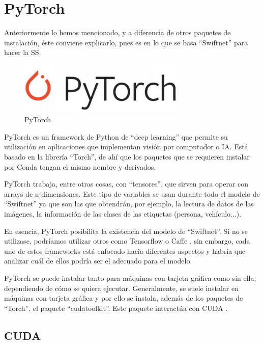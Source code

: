 \section{PyTorch}

Anteriormente lo hemos mencionado, y a diferencia de otros paquetes de instalación, éste conviene explicarlo, pues es en lo que se basa ``Swiftnet'' para hacer la \ac{SS}.

\begin{figure}[H]
  \centering
  \includegraphics[width=8cm]{Figuras/PyTorch.eps}
  \caption{PyTorch}
\end{figure}

PyTorch \cite{pytorch} es un framework de Python de ``deep learning'' que permite su utilización en aplicaciones que implementan visión por computador o IA. Está basado en la librería ``Torch'', de ahí que los paquetes que se requieren instalar por Conda tengan el mismo nombre y derivados.

PyTorch trabaja, entre otras cosas, con ``tensores'', que sirven para operar con arrays de n-dimensiones. Este tipo de variables se usan durante todo el modelo de ``Swiftnet'' ya que son las que obtendrán, por ejemplo, la lectura de datos de las imágenes, la información de las clases de las etiquetas (persona, vehículo...).

En esencia, PyTorch posibilita la existencia del modelo de ``Swiftnet''. Si no se utilizase, podríamos utilizar otros como Tensorflow \cite{tensorflow} o Caffe \cite{caffe}, sin embargo, cada uno de estos frameworks está enfocado hacia diferentes aspectos y habría que analizar cuál de ellos podría ser el adecuado para el modelo. 

PyTorch se puede instalar tanto para máquinas con tarjeta gráfica como sin ella, dependiendo de cómo se quiera ejecutar. Generalmente, se suele instalar en máquinas con tarjeta gráfica y por ello se instala, además de los paquetes de ``Torch'', el paquete ``cudatoolkit''. Este paquete interactúa con CUDA \cite {cuda}.

\subsection{CUDA}

